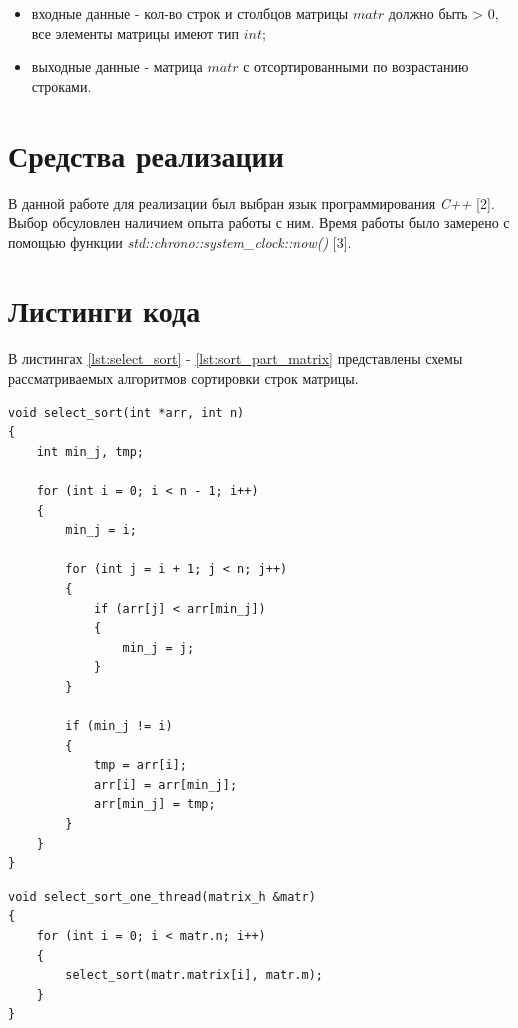 \documentclass[a4paper,14pt, unknownkeysallowed]{extreport}
\begin{document}
\begin{itemize}
    \item входные данные - кол-во строк и столбцов матрицы $matr$ должно быть > 0, все элементы матрицы имеют тип $int$;
    \item выходные данные - матрица $matr$ с отсортированными по возрастанию строками.
\end{itemize}

\section{Средства реализации}

В данной работе для реализации был выбран язык программирования \textit{C++} [2]. Выбор обсуловлен наличием опыта работы с ним. Время работы было замерено с помощью функции \textit{std::chrono::system\_clock::now()} [3].

\clearpage

\section{Листинги кода}

В листингах \ref{lst:select_sort} - \ref{lst:sort_part_matrix} представлены схемы рассматриваемых алгоритмов сортировки строк матрицы.

\begin{center}
\captionsetup{justification=raggedright,singlelinecheck=off}
\begin{lstlisting}[label=lst:select_sort,caption=Функция алгоритма сортировки массива вставками по возрастанию]
void select_sort(int *arr, int n)
{
	int min_j, tmp;
	
	for (int i = 0; i < n - 1; i++)
	{
		min_j = i;

		for (int j = i + 1; j < n; j++)
		{
			if (arr[j] < arr[min_j])
			{
				min_j = j;
			}
		}

		if (min_j != i)
		{
			tmp = arr[i];
			arr[i] = arr[min_j];
			arr[min_j] = tmp;
		}
	}
}
\end{lstlisting}
\end{center}

\clearpage

\begin{center}
\captionsetup{justification=raggedright,singlelinecheck=off}
\begin{lstlisting}[label=lst:select_sort_one_thread,caption=Функция однопоточной реализации сортировки выбором строк матрицы]
void select_sort_one_thread(matrix_h &matr)
{
	for (int i = 0; i < matr.n; i++)
	{
		select_sort(matr.matrix[i], matr.m);
	}
}
\end{lstlisting}
\end{center}
\end{document}
